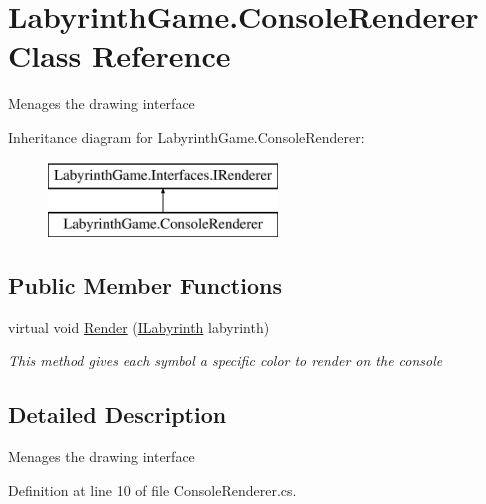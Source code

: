 \hypertarget{class_labyrinth_game_1_1_console_renderer}{\section{Labyrinth\+Game.\+Console\+Renderer Class Reference}
\label{class_labyrinth_game_1_1_console_renderer}
}


Menages the drawing interface  


Inheritance diagram for Labyrinth\+Game.\+Console\+Renderer\+:\begin{figure}[H]
\begin{center}
\leavevmode
\includegraphics[height=2.000000cm]{class_labyrinth_game_1_1_console_renderer}
\end{center}
\end{figure}
\subsection*{Public Member Functions}
\begin{DoxyCompactItemize}
\item 
virtual void \hyperlink{class_labyrinth_game_1_1_console_renderer_a4e1d4a210c07a261d5dbca5b471a2300}{Render} (\hyperlink{interface_labyrinth_game_1_1_interfaces_1_1_i_labyrinth}{I\+Labyrinth} labyrinth)
\begin{DoxyCompactList}\small\item\em This method gives each symbol a specific color to render on the console \end{DoxyCompactList}\end{DoxyCompactItemize}


\subsection{Detailed Description}
Menages the drawing interface 



Definition at line 10 of file Console\+Renderer.\+cs.



